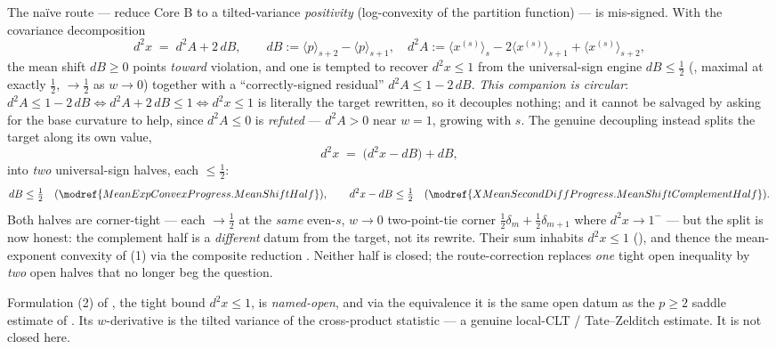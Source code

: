 \begin{remark}
\label{rem:core-b-halves}
The naïve route — reduce Core B to a tilted-variance \emph{positivity}
(log-convexity of the partition function) — is mis-signed.  With the covariance
decomposition
\[
  d^2 x \;=\; d^2 A + 2\,dB,
  \qquad
  dB := \langle p\rangle_{s+2}-\langle p\rangle_{s+1},
  \quad
  d^2 A := \langle x^{(s)}\rangle_s - 2\langle x^{(s)}\rangle_{s+1}
      + \langle x^{(s)}\rangle_{s+2},
\]
the mean shift $dB\ge 0$ points \emph{toward} violation, and one is tempted to
recover $d^2 x\le 1$ from the universal-sign engine $dB\le\tfrac12$
(, maximal at exactly $\tfrac12$,
$\to\tfrac12$ as $w\to0$) together with a ``correctly-signed residual''
$d^2 A\le 1-2\,dB$.  \emph{This companion is circular}:
$d^2 A\le 1-2\,dB \iff d^2 A + 2\,dB\le 1 \iff d^2 x\le 1$ is literally the target
rewritten, so it decouples nothing; and it cannot be salvaged by asking for the
base curvature to help, since $d^2 A\le 0$ is \emph{refuted} — $d^2 A>0$ near
$w=1$, growing with $s$.  The genuine decoupling instead splits the target along
its own value,
\[
  d^2 x \;=\; \bigl(d^2 x - dB\bigr) + dB,
\]
into \emph{two} universal-sign halves, each $\le\tfrac12$:
\[
  dB\le\tfrac12
    \quad(\modref{MeanExpConvexProgress.MeanShiftHalf}),
  \qquad
  d^2 x - dB\le\tfrac12
    \quad(\modref{XMeanSecondDiffProgress.MeanShiftComplementHalf}).
\]
Both halves are corner-tight — each $\to\tfrac12$ at the \emph{same} even-$s$,
$w\to0$ two-point-tie corner $\tfrac12\delta_m+\tfrac12\delta_{m+1}$ where
$d^2 x\to1^-$ — but the split is now honest: the complement half is a
\emph{different} datum from the target, not its rewrite.  Their sum inhabits
$d^2 x\le 1$ (), and thence the
mean-exponent convexity of (1) via the composite reduction
.  Neither half is closed;
the route-correction replaces \emph{one} tight open inequality by \emph{two} open
halves that no longer beg the question.
\end{remark}

\begin{remark}
\label{rem:core-b-gap-d2x}
Formulation (2) of , the tight bound $d^2 x\le 1$, is
\emph{named-open}, and via the equivalence it is the same open datum as the $p\ge 2$
saddle estimate of .  Its $w$-derivative is the tilted
variance of the cross-product statistic — a genuine local-CLT / Tate--Zelditch
estimate.  It is not closed here.
\end{remark}

